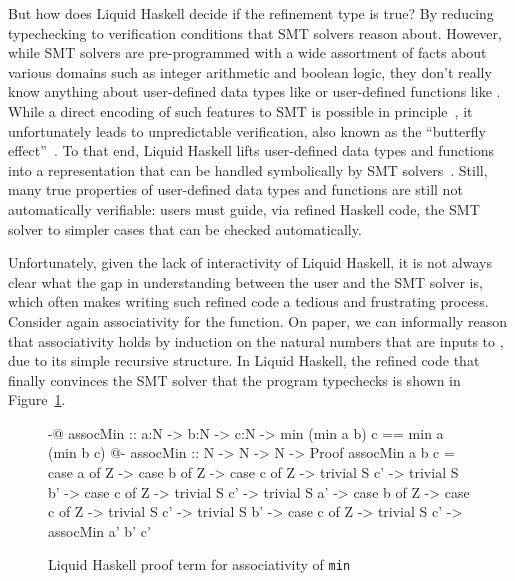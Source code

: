 But how does Liquid Haskell decide if the refinement type is true? By
reducing typechecking to verification conditions that SMT solvers
reason about. However, while SMT solvers are pre-programmed with a
wide assortment of facts about various domains such as integer
arithmetic and boolean logic, they don't really know anything about
user-defined data types like  or user-defined functions like
. While a direct encoding of such features to SMT is possible
in principle~\cite{HALO}, it unfortunately leads to unpredictable
verification, also known as the ``butterfly
effect''~\cite{LeinoP16}. To that end, Liquid Haskell lifts
user-defined data types and functions into a representation that can
be handled symbolically by SMT solvers~\cite{VazouTCSNWJ18}. Still,
many true properties of user-defined data types and functions are
still not automatically verifiable: users must guide, via refined
Haskell code, the SMT solver to simpler cases that can be checked
automatically.

Unfortunately, given the lack of interactivity of Liquid Haskell, it
is not always clear what the gap in understanding between the user and
the SMT solver is, which often makes writing such refined code a
tedious and frustrating process. Consider again associativity for the
 function. On paper, we can informally reason that
associativity holds by induction on the natural numbers that are inputs
to , due to its simple recursive structure. In Liquid Haskell,
the refined code that finally convinces the SMT solver that the
program typechecks is shown in Figure~\ref{fig:assoc-min-proof}.


\begin{figure}
\begin{code}
  {-@ assocMin :: a:N -> b:N -> c:N ->
        {min (min a b) c == min a (min b c)} @-}
  assocMin :: N -> N -> N -> Proof
  assocMin a b c =
    case a of 
      Z ->
        case b of 
          Z ->
            case c of
              Z -> trivial
              S c' -> trivial
          S b' ->
            case c of
              Z -> trivial
              S c' -> trivial
    S a' ->
      case b of 
        Z ->
          case c of
            Z -> trivial
            S c' -> trivial
        S b' ->
          case c of
            Z -> trivial
            S c' -> assocMin a' b' c'
\end{code}
\caption{Liquid Haskell proof term for associativity of \texttt{min}}
\label{fig:assoc-min-proof}
\end{figure}


